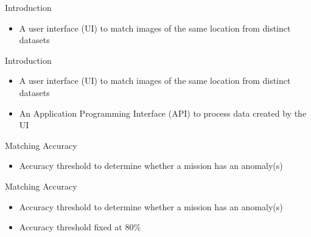 \begin{frame}{Introduction}
    \begin{itemize}
        \item A user interface (UI) to match images of the same location from distinct datasets
    \end{itemize}
\end{frame}

\begin{frame}{Introduction}
    \begin{itemize}
        \item A user interface (UI) to match images of the same location from distinct datasets
        \item An Application Programming Interface (API) to process data created by the UI
    \end{itemize}
\end{frame}


\begin{frame}{Matching Accuracy}
    \begin{itemize}
        \item Accuracy threshold to determine whether a mission has an anomaly(s)
    \end{itemize}
\end{frame}

\begin{frame}{Matching Accuracy}
    \begin{itemize}
        \item Accuracy threshold to determine whether a mission has an anomaly(s)
        \item Accuracy threshold fixed at 80\%
    \end{itemize}
\end{frame}

